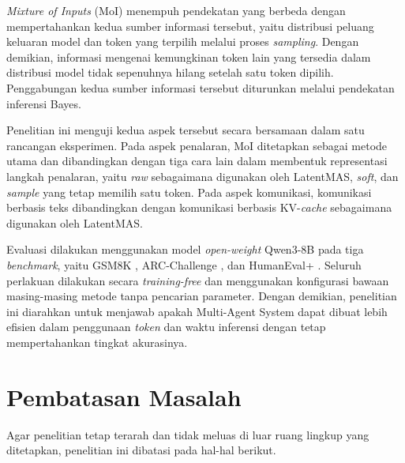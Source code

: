 \textit{Mixture of Inputs} (MoI) \citep{moi} menempuh pendekatan yang berbeda
dengan mempertahankan kedua sumber informasi tersebut, yaitu distribusi
peluang keluaran model dan token yang terpilih melalui proses
\textit{sampling}. Dengan demikian, informasi mengenai kemungkinan token lain
yang tersedia dalam distribusi model tidak sepenuhnya hilang setelah satu
token dipilih. Penggabungan kedua sumber informasi tersebut diturunkan melalui
pendekatan inferensi Bayes.

Penelitian ini menguji kedua aspek tersebut secara bersamaan dalam satu
rancangan eksperimen. Pada aspek penalaran, MoI \citep{moi} ditetapkan sebagai
metode utama dan dibandingkan dengan tiga cara lain dalam membentuk
representasi langkah penalaran, yaitu \textit{raw} sebagaimana digunakan oleh
LatentMAS, \textit{soft}, dan \textit{sample} yang tetap memilih satu token.
Pada aspek komunikasi, komunikasi berbasis teks dibandingkan dengan komunikasi
berbasis KV-\textit{cache} sebagaimana digunakan oleh LatentMAS.

Evaluasi dilakukan menggunakan model \textit{open-weight} Qwen3-8B
\citep{qwen3} pada tiga \textit{benchmark}, yaitu GSM8K \citep{gsm8k},
ARC-Challenge \citep{arc}, dan HumanEval+ \citep{evalplus}. Seluruh perlakuan
dilakukan secara \textit{training-free} dan menggunakan konfigurasi bawaan
masing-masing metode tanpa pencarian parameter. Dengan demikian, penelitian
ini diarahkan untuk menjawab apakah Multi-Agent System dapat dibuat lebih
efisien dalam penggunaan \textit{token} dan waktu inferensi dengan tetap
mempertahankan tingkat akurasinya.


\section{Pembatasan Masalah}

Agar penelitian tetap terarah dan tidak meluas di luar ruang lingkup yang
ditetapkan, penelitian ini dibatasi pada hal-hal berikut.

